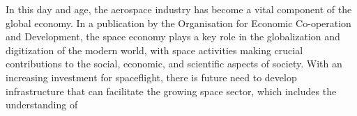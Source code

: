 In this day and age, the aerospace industry has become a vital component of the global economy.
In a publication by the Organisation for Economic Co-operation and Development, the space economy plays a key role in the globalization and digitization of the modern world, with space activities making crucial contributions to the social, economic, and scientific aspects of society\autocite{c5996201-en}.
With an increasing investment for spaceflight, there is future need to develop infrastructure that can facilitate the growing space sector, which includes the understanding of 